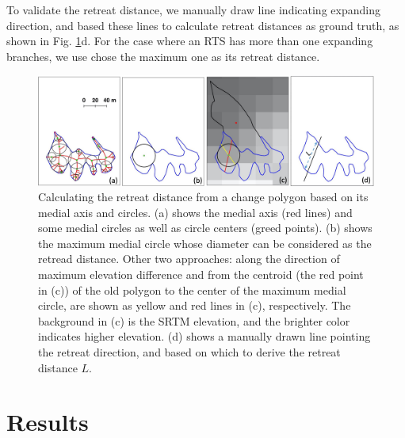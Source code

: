 \documentclass[authoryear,preprint,review,12pt]{elsarticle}
\begin{document}

To validate the retreat distance, we manually draw line indicating expanding direction, and based these lines to calculate retreat distances as ground truth, as shown in Fig. \ref{fig_retreat_dis}d. 
For the case where an RTS has more than one expanding branches, we use chose the maximum one as its retreat distance. 

\begin{figure} 
	\centering
	\includegraphics[width=14cm]{figs/retreat_distance_trim.jpg}
	\caption{Calculating the retreat distance from a change polygon based on its medial axis and circles. (a) shows the medial axis (red lines) and some medial circles as well as circle centers (greed points). (b) shows the maximum medial circle whose diameter can be considered as the retread distance. Other two approaches: along the direction of maximum elevation difference and from the centroid (the red point in (c)) of the old polygon to the center of the maximum medial circle, are shown as yellow and red lines in (c), respectively. The background in (c) is the SRTM elevation, and the brighter color indicates higher elevation. (d) shows a manually drawn line pointing the retreat direction, and based on which to derive the retreat distance $L$. }
	\label{fig_retreat_dis}
\end{figure}



\section{Results}
\label{sec_result}
\end{document}
